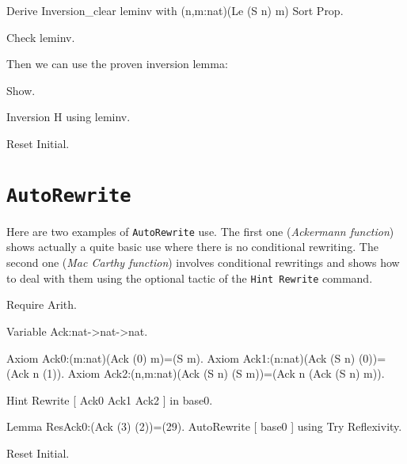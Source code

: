 \begin{coq_example*}
\begin{coq_example*}
Derive Inversion_clear leminv with (n,m:nat)(Le (S n) m) Sort Prop.
\end{coq_example*}

\begin{coq_example}
Check leminv.
\end{coq_example}

Then we can use the proven inversion lemma:

\begin{coq_example}
Show.
\end{coq_example}

\begin{coq_example}
Inversion H using leminv.
\end{coq_example}

\begin{coq_eval}
Reset Initial.
\end{coq_eval}

\section{\tt AutoRewrite}
\label{AutoRewrite-example}

Here are two examples of {\tt AutoRewrite} use. The first one ({\em Ackermann
function}) shows actually a quite basic use where there is no conditional
rewriting. The second one ({\em Mac Carthy function}) involves conditional
rewritings and shows how to deal with them using the optional tactic of the
{\tt Hint~Rewrite} command.

\firstexample
{}

\begin{coq_example*}
Require Arith.

Variable Ack:nat->nat->nat.

Axiom Ack0:(m:nat)(Ack (0) m)=(S m).
Axiom Ack1:(n:nat)(Ack (S n) (0))=(Ack n (1)).
Axiom Ack2:(n,m:nat)(Ack (S n) (S m))=(Ack n (Ack (S n) m)).
\end{coq_example*}

\begin{coq_example}
Hint Rewrite [ Ack0 Ack1 Ack2 ] in base0.

Lemma ResAck0:(Ack (3) (2))=(29).
AutoRewrite [ base0 ] using Try Reflexivity.
\end{coq_example}

\begin{coq_eval}
Reset Initial.  
\end{coq_eval}


\end{coq_example*}
